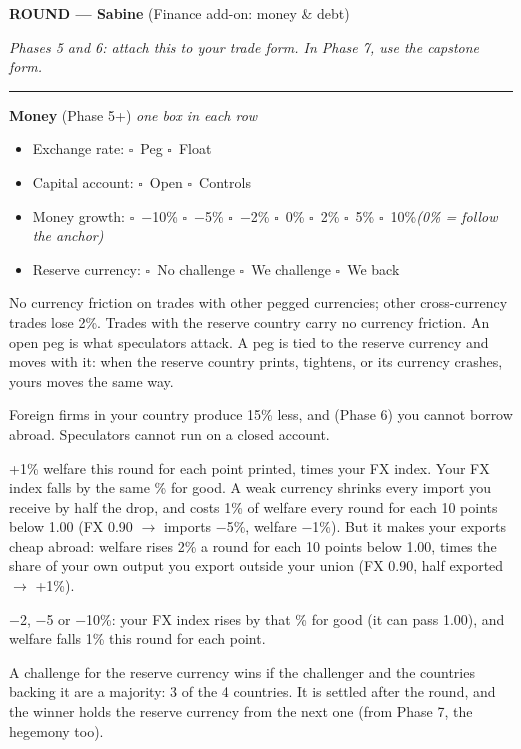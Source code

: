 \documentclass[11pt]{article}
\newcommand{\blank}[1]{\underline{\hspace{#1}}}
\newcommand{\boxx}{$\square$}
\newcommand{\hr}{\par\vspace{2pt}\noindent\rule{\linewidth}{0.4pt}\par\vspace{2pt}}
\begin{document}
{\large\bfseries ROUND \blank{1cm} --- Sabine} \hfill (Finance add-on: money \& debt)\par
\textit{Phases 5 and 6: attach this to your trade form. In Phase 7, use the capstone form.}
\hr

{\bfseries Money} (Phase 5+) \hfill \textit{one box in each row}\par
\begin{itemize}[nosep,leftmargin=1.4em]
  \item Exchange rate: \quad \boxx\ Peg \quad \boxx\ Float
  \item Capital account: \quad \boxx\ Open \quad \boxx\ Controls
  \item Money growth: \quad \boxx\ $-$10\% \quad \boxx\ $-$5\% \quad \boxx\ $-$2\% \quad \boxx\ 0\% \quad \boxx\ 2\% \quad \boxx\ 5\% \quad \boxx\ 10\%\newline \textit{(0\% = follow the anchor)}
  \item Reserve currency: \quad \boxx\ No challenge \quad \boxx\ We challenge \quad \boxx\ We back \blank{2.2cm}
\end{itemize}
{\small
\begin{description}[nosep,style=sameline,leftmargin=5.6em,font=\normalfont\bfseries]
  \item[Peg] No currency friction on trades with other pegged currencies; other cross-currency trades lose 2\%. Trades with the reserve country carry no currency friction. An open peg is what speculators attack. A peg is tied to the reserve currency and moves with it: when the reserve country prints, tightens, or its currency crashes, yours moves the same way.
  \item[Controls] Foreign firms in your country produce 15\% less, and (Phase 6) you cannot borrow abroad. Speculators cannot run on a closed account.
  \item[Printing] +1\% welfare this round for each point printed, times your FX index. Your FX index falls by the same \% for good. A weak currency shrinks every import you receive by half the drop, and costs 1\% of welfare every round for each 10 points below 1.00 (FX 0.90 $\to$ imports $-$5\%, welfare $-$1\%). But it makes your exports cheap abroad: welfare rises 2\% a round for each 10 points below 1.00, times the share of your own output you export outside your union (FX 0.90, half exported $\to$ +1\%).
  \item[Tightening] $-$2, $-$5 or $-$10\%: your FX index rises by that \% for good (it can pass 1.00), and welfare falls 1\% this round for each point.
  \item[Challenge] A challenge for the reserve currency wins if the challenger and the countries backing it are a majority: 3 of the 4 countries. It is settled after the round, and the winner holds the reserve currency from the next one (from Phase 7, the hegemony too).
\end{description}}
\end{document}
